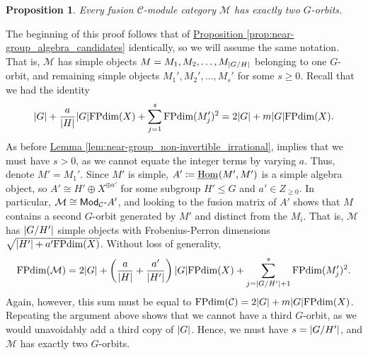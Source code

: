\documentclass[12pt, reqno]{amsart}
\numberwithin{equation}{section}
\theoremstyle{plainspace}
\newtheorem{proposition}[theorem]{Proposition}
\theoremstyle{definitionspace}
\theoremstyle{remarkspace}
\renewenvironment{proof}{{\noindent\textbf{Proof.}}}{\null\hfill\qedsymbol}
\DeclarePairedDelimiter{\abs}{\lvert}{\rvert}
\newcommand{\mathcat}[1]{\mathcal{#1}}
\newcommand{\IntHom}[2][]{
	\ifthenelse{\equal{#2}{}}
		{\underline{\textup{Hom}}_{#1}}
		{\underline{\textup{Hom}}_{#1}\!\left(#2\right)}
}
\newcommand{\textcat}[1]{\textup{\textsf{#1}}}
\newcommand{\rmodcat}[2][]{\textcat{Mod}_{#1}\textcat{-}#2}
\newcommand{\FPdim}{\textup{FPdim}}
\begin{document}
\begin{proposition}\label{prop:near-group_algebra_orbits}
Every fusion $\mathcat{C}$-module category $\mathcat{M}$ has exactly two $G$-orbits.
\end{proposition}
\leavevmode\newline
\begin{proof}
\noindent The beginning of this proof follows that of \hyperref[prop:near-group_algebra_candidates]{Proposition \ref*{prop:near-group_algebra_candidates}} identically, so we will assume the same notation. That is, $\mathcat{M}$ has simple objects $M = M_1, M_2, \dots, M_{\abs{G/H}}$ belonging to one $G$-orbit, and remaining simple objects $M_1', M_2', \dots, M_s'$ for some $s \geq 0$. Recall that we had the identity
\begin{align*}
\begin{split}
\abs{G} + \frac{a}{\abs{H}}\abs{G}\FPdim(X) + \sum_{j=1}^{s}{\FPdim(M_j')^2} = 2\abs{G} + m\abs{G}\FPdim(X).
\end{split}
\end{align*}
\noindent As before \hyperref[lem:near-group_non-invertible_irrational]{Lemma \ref*{lem:near-group_non-invertible_irrational}}, implies that we must have $s > 0$, as we cannot equate the integer terms by varying $a$. Thus, denote $M' = M_1'$. Since $M'$ is simple, $A' \coloneqq \IntHom{M', M'}$ is a simple algebra object, so $A' \cong H' \oplus X^{\oplus a'}$ for some subgroup $H' \leq G$ and $a' \in Z_{\geq 0}$. In particular, $\mathcat{M} \cong \rmodcat[\mathcat{C}]{A'}$, and looking to the fusion matrix of $A'$ shows that $M$ contains a second $G$-orbit generated by $M'$ and distinct from the $M_i$. That is, $\mathcat{M}$ has $\abs{G/H'}$ simple objects with Frobenius-Perron dimensions $\sqrt{\abs{H'} + a'\FPdim(X)}$. Without loss of generality,
\begin{align}
\begin{split}
\label{eq:near-group_module_dimension}
\FPdim(\mathcat{M}) = 2\abs{G} + \left(\frac{a}{\abs{H}} + \frac{a'}{\abs{H'}}\right)\abs{G}\FPdim(X) + \sum_{j=\abs{G/H'}+1}^{s}{\FPdim(M_j')^2}.
\end{split}
\end{align}
\noindent Again, however, this sum must be equal to $\FPdim(\mathcat{C}) = 2\abs{G} + m\abs{G}\FPdim(X)$. Repeating the argument above shows that we cannot have a third $G$-orbit, as we would unavoidably add a third copy of $\abs{G}$. Hence, we must have $s = \abs{G/H'}$, and $\mathcat{M}$ has exactly two $G$-orbits.
\end{proof}
\newline
\end{document}
